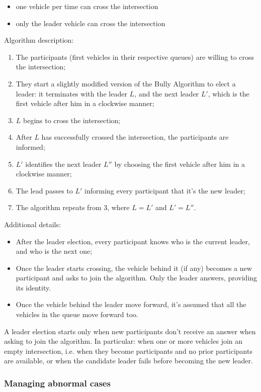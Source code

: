 \documentclass{memoir}
\begin{document}
\begin{itemize}
	\item one vehicle per time can cross the intersection
	\item only the leader vehicle can cross the intersection
\end{itemize}
Algorithm description:
\begin{enumerate}
	\item The participants (first vehicles in their respective queues) are willing to cross the intersection;
	\item They start a slightly modified version of the Bully Algorithm to elect a leader: it terminates with the leader $L$, and the next leader $L'$, which is the first vehicle after him in a clockwise manner;
	\item $L$ begins to cross the intersection;
	\item After $L$ has successfully crossed the intersection, the participants are informed;
	\item $L'$ identifies the next leader $L''$ by choosing the first vehicle after him in a clockwise manner;
	\item The lead passes to $L'$ informing every participant that it's the new leader;
	\item The algorithm repeats from 3, where $L = L'$ and $L' = L''$.
\end{enumerate}
Additional details:
\begin{itemize}
	\item After the leader election, every participant knows who is the current leader, and who is the next one;
	\item Once the leader starts crossing, the vehicle behind it (if any) becomes a new participant and asks to join the algorithm. Only the leader answers, providing its identity.
	\item Once the vehicle behind the leader move forward, it's assumed that all the vehicles in the queue move forward too.
\end{itemize}
A leader election starts only when new participants don't receive an answer when asking to join the algorithm. In particular: when one or more vehicles join an empty intersection, i.e. when they become participants and no prior participants are available, or when the candidate leader fails before becoming the new leader.

\subsubsection{Managing abnormal cases}
\end{document}
